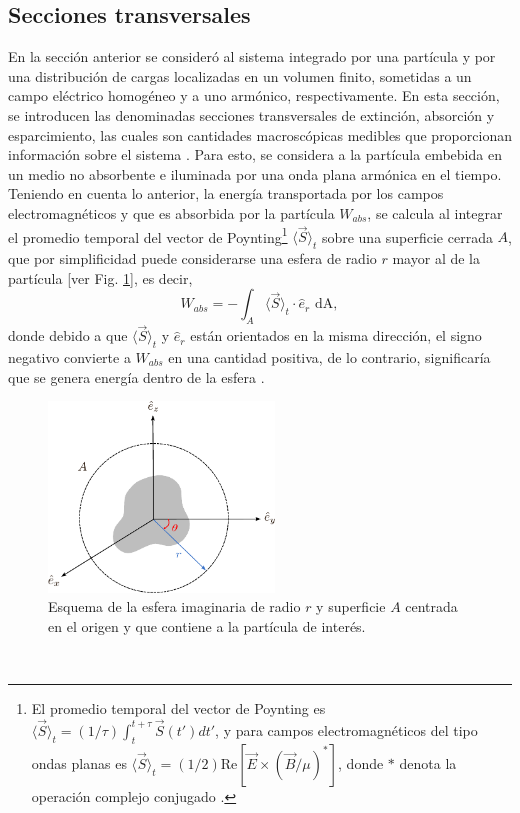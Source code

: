 \hypertarget{Cext}{\subsection{Secciones transversales}}

En la sección anterior se consideró al sistema integrado por una partícula y por una distribución de cargas localizadas en un volumen finito, sometidas a un campo eléctrico homogéneo y a uno armónico, respectivamente. En esta sección, se introducen las denominadas secciones transversales de extinción, absorción y esparcimiento, las cuales son cantidades macroscópicas medibles que proporcionan información sobre el sistema \cite{Bohren}. Para esto, se considera a la partícula embebida en un medio no absorbente e iluminada por una onda plana armónica en el tiempo. Teniendo en cuenta lo anterior, la energía transportada por los campos electromagnéticos y que es absorbida por la partícula $W_{abs}$, se calcula al integrar el promedio temporal del vector de Poynting\footnote{El promedio temporal del vector de Poynting es $\langle\Vec{S}\rangle_t = (1/\tau)\int_t^{t+\tau}\Vec{S}(t')dt'$, y para campos electromagnéticos del tipo ondas planas es $\langle\Vec{S}\rangle_t = (1/2) \text{Re}[\Vec{E} \times (\Vec{B}/\mu)^{*}]$, donde $*$ denota la operación complejo conjugado \cite{Bohren}. } $\langle\Vec{S}\rangle_t$  sobre una superficie cerrada $A$, que por simplificidad puede considerarse una esfera de radio $r$ mayor al de la partícula [ver Fig. \ref{WA}], es decir, 
\begin{equation*}
	W_{abs}=-\int_A \langle\Vec{S}\rangle_t\cdot\hat{e}_r \text{ dA},
	\label{flujopoynting}
\end{equation*}
donde debido a que $\langle\Vec{S}\rangle_t$ y $\hat{e}_r$ están orientados en la misma dirección, el signo negativo convierte a $W_{abs}$ en una cantidad positiva, de lo contrario, significaría que se genera energía dentro de la esfera \cite{Bohren}.
\begin{figure}[h]
	\centering
	\includegraphics[width=6cm]{../../Figuras/WA.pdf}
	\caption{Esquema de la esfera imaginaria  de radio $r$ y superficie $A$ centrada en el origen y que contiene a la partícula de interés.}
	\label{WA}
\end{figure}
\\

